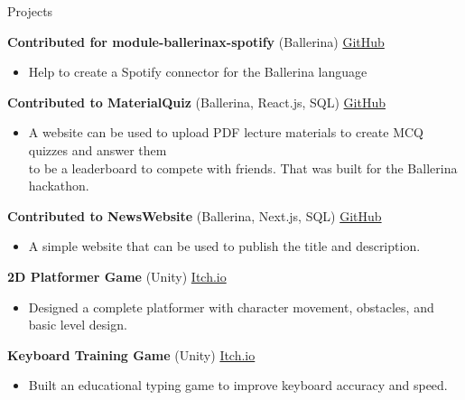 \documentclass{resume} %
\begin{document}
\begin{rSection}{Projects}
\vspace{-1.25em}

\item \textbf{Contributed for module-ballerinax-spotify} (Ballerina) \hfill \href{https://github.com/ballerina-platform/module-ballerinax-spotify}{GitHub}
\begin{itemize}
    \itemsep -3pt {} 
    \item Help to create a Spotify connector for the Ballerina language 
\end{itemize}

\item \textbf{Contributed to MaterialQuiz } (Ballerina, React.js, SQL) \hfill \href{https://github.com/Sachindu-Nethmin/iwb25-197-integrators}{GitHub}
\begin{itemize}
    \itemsep -3pt {} 
    \item A website can be used to upload PDF lecture materials to create MCQ quizzes and answer them \\to be a leaderboard to compete with friends. That was built for the Ballerina hackathon.
\end{itemize}

\item \textbf{Contributed to NewsWebsite } (Ballerina, Next.js, SQL) \hfill \href{https://github.com/Sachindu-Nethmin/news-website-ballerina}{GitHub}
\begin{itemize}
    \itemsep -3pt {} 
    \item A simple website that can be used to publish the title and description.
\end{itemize}

\item \textbf{2D Platformer Game} (Unity) \hfill \href{https://sachindu-nethmin.itch.io/grow-in-the-dark}{Itch.io}
\begin{itemize}
    \itemsep -3pt {} 
    \item Designed a complete platformer with character movement, obstacles, and basic level design.
\end{itemize}

\item \textbf{Keyboard Training Game} (Unity) \hfill \href{https://sachindu-nethmin.itch.io/trigger}{Itch.io}
\begin{itemize}
    \itemsep -3pt {}
    \item Built an educational typing game to improve keyboard accuracy and speed.
\end{itemize}


\end{rSection}
\end{document}
